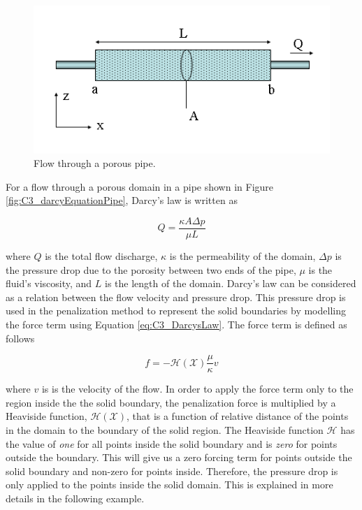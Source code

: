 \begin{figure}[H]
	\centering
	\includegraphics[width=14.cm]{Chapter_3/figure/Darcys_Law.png}
	\caption{Flow through a porous pipe.}
\end{figure}

For a flow through a porous domain in a pipe shown in Figure \ref{fig:C3_darcyEquationPipe}, Darcy's law is written as

\begin{equation}\label{eq:C3_DarcysLaw}
	Q = \frac{\kappa A \Delta p}{\mu L}
\end{equation}

where $Q$ is the total flow discharge, $\kappa$ is the permeability of the domain, $\Delta p$ is the pressure drop due to the porosity between two ends of the pipe, $\mu$ is the fluid's viscosity, and $L$ is the length of the domain. Darcy's law can be considered as a relation between the flow velocity and pressure drop. This pressure drop  is used in the penalization method to represent the solid boundaries by modelling the force term using Equation \eqref{eq:C3_DarcysLaw}. The force term is defined as follows

\begin{equation}\label{eq:C3_forceTermIBpenelization}
	f = - \mathcal{H}(\mathcal{X}) \frac{\mu}{\kappa} v
\end{equation}

where $v$ is is the velocity of the flow. In order to apply the force term only to the region inside the the solid boundary, the penalization force is multiplied by a Heaviside function, $\mathcal{H}(\mathcal{X})$, that is a function of relative distance of the points in the domain to the boundary of the solid region. The Heaviside function $\mathcal{H}$ has the value of \emph{one} for all points inside the solid boundary and is \emph{zero} for points outside the boundary. This will give us a zero forcing term for points outside the solid boundary and non-zero for points inside. Therefore, the pressure drop is only applied to the points inside the solid domain. This is explained in more details in the following example.

